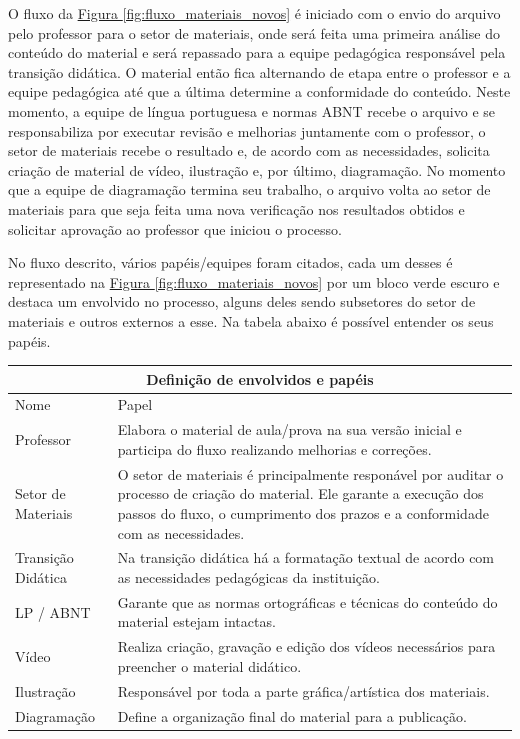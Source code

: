 O fluxo da \hyperref[fig:fluxo_materiais_novos]{Figura \ref{fig:fluxo_materiais_novos}} é iniciado com o envio do arquivo pelo professor para o setor de materiais, onde será feita uma primeira análise do conteúdo do material e será repassado para a equipe pedagógica responsável pela transição didática. O material então fica alternando de etapa entre o professor e a equipe pedagógica até que a última determine a conformidade do conteúdo. Neste momento, a equipe de língua portuguesa e normas ABNT recebe o arquivo e se responsabiliza por executar revisão e melhorias juntamente com o professor, o setor de materiais recebe o resultado e, de acordo com as necessidades, solicita criação de material de vídeo, ilustração e, por último, diagramação. No momento que a equipe de diagramação termina seu trabalho, o arquivo volta ao setor de materiais para que seja feita uma nova verificação nos resultados obtidos e solicitar aprovação ao professor que iniciou o processo.

No fluxo descrito, vários papéis/equipes foram citados, cada um desses é representado na \hyperref[fig:fluxo_materiais_novos]{Figura \ref{fig:fluxo_materiais_novos}} por um bloco verde escuro e destaca um envolvido no processo, alguns deles sendo subsetores do setor de materiais e outros externos a esse. Na tabela abaixo é possível entender os seus papéis.

\begin{center}
    \begin{tabularx}{\textwidth}{ |X|X| }
    \hline
    \multicolumn{2}{|c|}{Definição de envolvidos e papéis} \\
    \hline
    Nome & Papel \\ \hline
    Professor & Elabora o material de aula/prova na sua versão inicial e participa do fluxo realizando melhorias e correções. \\ \hline
    Setor de Materiais & O setor de materiais é principalmente responável por auditar o processo de criação do material. Ele garante a execução dos passos do fluxo, o cumprimento dos prazos e a conformidade com as necessidades. \\ \hline
    Transição Didática & Na transição didática há a formatação textual de acordo com as necessidades pedagógicas da instituição.  \\ \hline
    LP / ABNT & Garante que as normas ortográficas e técnicas do conteúdo do material estejam intactas. \\ \hline
    Vídeo & Realiza criação, gravação e edição dos vídeos necessários para preencher o material didático. \\ \hline
   	Ilustração & Responsável por toda a parte gráfica/artística dos materiais. \\ \hline
   	Diagramação & Define a organização final do material para a publicação. \\ \hline
    \end{tabularx}
\end{center}

